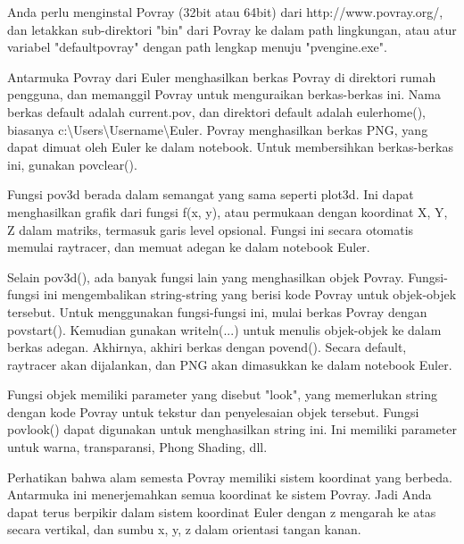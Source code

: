 \begin{eulercomment}
\begin{eulercomment}
Anda perlu menginstal Povray (32bit atau 64bit) dari
http://www.povray.org/, dan letakkan sub-direktori "bin" dari Povray ke dalam path lingkungan, atau atur variabel "defaultpovray" dengan path lengkap menuju "pvengine.exe".

Antarmuka Povray dari Euler menghasilkan berkas Povray di direktori
rumah pengguna, dan memanggil Povray untuk menguraikan berkas-berkas
ini. Nama berkas default adalah current.pov, dan direktori default
adalah eulerhome(), biasanya c:\textbackslash{}Users\textbackslash{}Username\textbackslash{}Euler. Povray
menghasilkan berkas PNG, yang dapat dimuat oleh Euler ke dalam
notebook. Untuk membersihkan berkas-berkas ini, gunakan povclear().

Fungsi pov3d berada dalam semangat yang sama seperti plot3d. Ini dapat
menghasilkan grafik dari fungsi f(x, y), atau permukaan dengan
koordinat X, Y, Z dalam matriks, termasuk garis level opsional. Fungsi
ini secara otomatis memulai raytracer, dan memuat adegan ke dalam
notebook Euler.

Selain pov3d(), ada banyak fungsi lain yang menghasilkan objek Povray.
Fungsi-fungsi ini mengembalikan string-string yang berisi kode Povray
untuk objek-objek tersebut. Untuk menggunakan fungsi-fungsi ini, mulai
berkas Povray dengan povstart(). Kemudian gunakan writeln(...) untuk
menulis objek-objek ke dalam berkas adegan. Akhirnya, akhiri berkas
dengan povend(). Secara default, raytracer akan dijalankan, dan PNG
akan dimasukkan ke dalam notebook Euler.

Fungsi objek memiliki parameter yang disebut "look", yang memerlukan
string dengan kode Povray untuk tekstur dan penyelesaian objek
tersebut. Fungsi povlook() dapat digunakan untuk menghasilkan string
ini. Ini memiliki parameter untuk warna, transparansi, Phong Shading,
dll.

Perhatikan bahwa alam semesta Povray memiliki sistem koordinat yang
berbeda. Antarmuka ini menerjemahkan semua koordinat ke sistem Povray.
Jadi Anda dapat terus berpikir dalam sistem koordinat Euler dengan z
mengarah ke atas secara vertikal, dan sumbu x, y, z dalam orientasi
tangan kanan.


\end{eulercomment}
\end{eulercomment}
